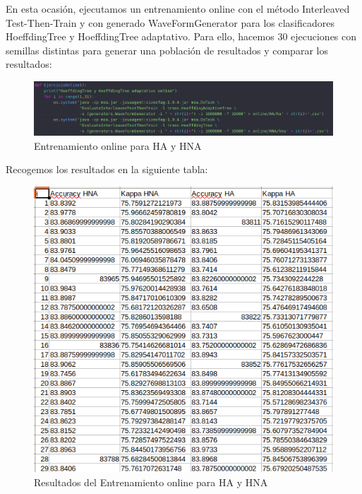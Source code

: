 En esta ocasión, ejecutamos un entrenamiento online con el método Interleaved Test-Then-Train y con generado WaveFormGenerator para los clasificadores HoeffdingTree y HoeffdingTree adaptativo. Para ello, hacemos 30 ejecuciones con semillas distintas para generar una población de resultados y comparar los resultados:

\begin{figure}[H] %
	\centering
	\includegraphics[scale=0.4]{onl1.png}  %
	\caption{Entrenamiento online para HA y HNA} 
	\label{fig:onl1}
\end{figure}

Recogemos los resultados en la siguiente tabla:

\begin{figure}[H] %
	\centering
	\includegraphics[scale=0.4]{onl-res.png}  %
	\caption{Resultados del Entrenamiento online para HA y HNA} 
	\label{fig:onl2}
\end{figure}

